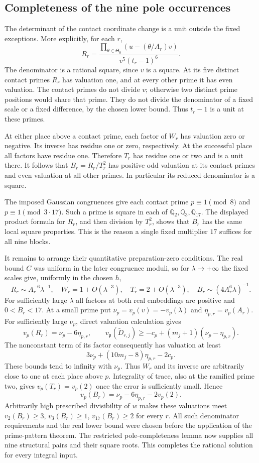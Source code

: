 \documentclass[11pt]{article}
\theoremstyle{definition}
\begin{document}
\subsection{Completeness of the nine pole occurrences}
The determinant of the contact coordinate change is a unit outside
the fixed exceptions. More explicitly, for each $r$,
\[
 R_r=\frac{\prod_{\theta\in\Theta_0}(u-(\theta/A_r)v)}
             {v^5(t_r-1)^6}.
\]
The denominator is a rational square, since $v$ is a square.
At its five distinct contact primes $R_r$ has valuation one, and
at every other prime it has even valuation. The contact primes do
not divide $v$; otherwise two distinct prime positions would share
that prime. They do not divide the denominator of a fixed scale or
a fixed difference, by the chosen lower bound. Thus $t_r-1$ is a
unit at these primes.

At either place above a contact prime, each factor of $W_r$ has
valuation zero or negative. Its inverse has residue one or zero,
respectively. At the successful place all factors have residue one.
Therefore $T_r$ has residue one or two and is a unit there. It follows
that $B_r=R_r/T_r^2$ has positive odd valuation at its contact primes
and even valuation at all other primes. In particular its reduced
denominator is a square.

The imposed Gaussian congruences give each contact prime
$p\equiv1\pmod8$ and $p\equiv1\pmod{3\cdot17}$. Such a prime is
square in each of $\mathbb Q_2,\mathbb Q_3,\mathbb Q_{17}$.
The displayed product formula for $R_r$, and then division by $T_r^2$,
shows that $B_r$ has the same local square properties. This is the
reason a single fixed multiplier $17$ suffices for all nine blocks.

It remains to arrange their quantitative preparation-zero conditions.
The real bound $C$ was uniform in the later congruence moduli, so for
$\lambda\to+\infty$ the fixed scales give, uniformly in the chosen $h$,
\[
 R_r\sim A_r^{-6}\lambda^{-1},\quad
 W_r=1+O(\lambda^{-3}),\quad T_r=2+O(\lambda^{-3}),\quad
 B_r\sim(4A_r^6\lambda)^{-1}.
\]
For sufficiently large $\lambda$ all factors at both real embeddings
are positive and $0<B_r<17$. At a small prime put
$\nu_p=v_p(v)=-v_p(\lambda)$ and $\eta_{p,r}=v_p(A_r)$.
For sufficiently large $\nu_p$, direct valuation calculation gives
\[
 v_p(R_r)=\nu_p-6\eta_{p,r},\qquad
 v_{\mathfrak p}(\widetilde D_{r,j})
 \ge-c_p+(m_j+1)(\nu_p-\eta_{p,r}).
\]
The nonconstant term of its factor consequently has valuation at least
\[
 3\nu_p+(10m_j-8)\eta_{p,r}-2c_p.
\]
These bounds tend to infinity with $\nu_p$. Thus $W_r$ and its inverse
are arbitrarily close to one at each place above $p$. Integrality of
trace, also at the ramified prime two, gives
$v_p(T_r)=v_p(2)$ once the error is sufficiently small. Hence
\[
 v_p(B_r)=\nu_p-6\eta_{p,r}-2v_p(2).
\]
Arbitrarily high prescribed divisibility of $w$ makes these valuations
meet $v_2(B_r)\ge3$, $v_3(B_r)\ge1$, $v_{17}(B_r)\ge2$ for every $r$.
All such denominator requirements and the real lower bound were chosen
before the application of the prime-pattern theorem. The restricted
pole-completeness lemma now supplies all nine structural pairs and
their square roots. This completes the rational solution for every
integral input.
\end{document}
